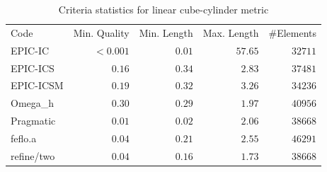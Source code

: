 \documentclass[3p,times,procedia,number]{elsarticle}
\begin{document}
\begin{table}
\caption{Criteria statistics for linear cube-cylinder metric}
\label{tab:cube-cylinder-linear-stats}
\begin{tabular}{lrrrr}
Code & Min. Quality & Min. Length & Max. Length & \#Elements\\
EPIC-IC    &$<0.001$&       $0.01$&      $57.65$&    $32711$\\
EPIC-ICS   &  $0.16$&       $0.34$&      $ 2.83$&    $37481$\\
EPIC-ICSM  &  $0.19$&       $0.32$&      $ 3.26$&    $34236$\\
Omega\_h   &  $0.30$&       $0.29$&      $ 1.97$&    $40956$\\
Pragmatic  &  $0.01$&       $0.02$&      $ 2.06$&    $38668$\\
feflo.a    &  $0.04$&       $0.21$&      $ 2.55$&    $46291$\\
refine/two &  $0.04$&       $0.16$&      $ 1.73$&    $38668$\\
\end{tabular}
\end{table}
\end{document}
